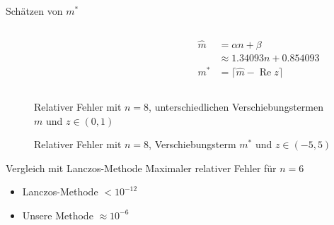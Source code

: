 \begin{frame}{Schätzen von $m^*$}
\begin{columns}
\begin{column}{0.6\textwidth}
\begin{figure}
\centering
\vspace{-24pt}
\scalebox{0.7}{}
\end{figure}
\end{column}
\begin{column}{0.39\textwidth}
\begin{align*}
\hat{m}
&=
\alpha n + \beta
\\
&\approx
1.34093 n + 0.854093
\\
m^*
&=
\lceil \hat{m} - \operatorname{Re}z \rceil
\end{align*}
\end{column}
\end{columns}

\end{frame}

\begin{frame}{}
\begin{figure}[h]
\centering
\scalebox{0.6}{}
\caption{Relativer Fehler mit $n=8$, unterschiedlichen Verschiebungstermen $m$ und $z\in(0, 1)$}
\end{figure}
\end{frame}

\begin{frame}{}
\begin{figure}[h]
\centering
\scalebox{0.6}{}
\caption{Relativer Fehler mit $n=8$, Verschiebungsterm $m^*$ und $z\in(-5, 5)$}
\end{figure}
\end{frame}

\begin{frame}{Vergleich mit Lanczos-Methode}
Maximaler relativer Fehler für $n=6$
\begin{itemize}
    \item Lanczos-Methode $< 10^{-12}$
    \item Unsere Methode $\approx 10^{-6}$ 
\end{itemize}
\end{frame}